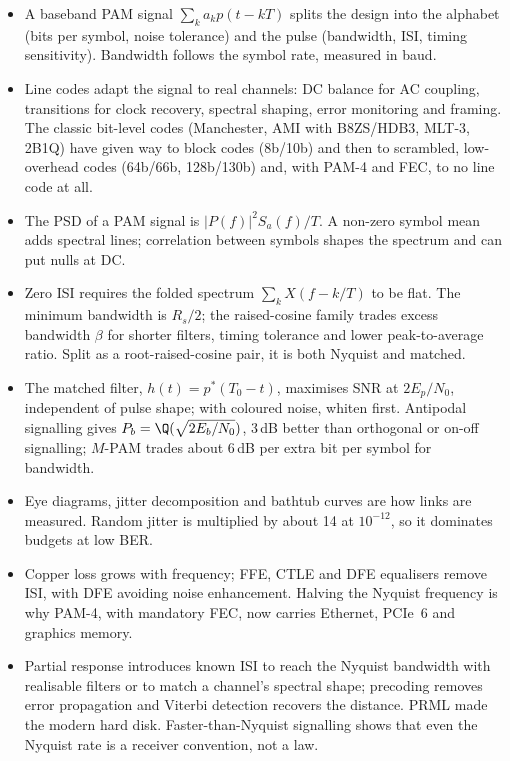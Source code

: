 \begin{itemize}
\item A baseband PAM signal $\sum_ka_kp(t-kT)$ splits the design into the alphabet (bits per
symbol, noise tolerance) and the pulse (bandwidth, ISI, timing sensitivity). Bandwidth follows
the symbol rate, measured in baud.
\item Line codes adapt the signal to real channels: DC balance for AC coupling, transitions for
clock recovery, spectral shaping, error monitoring and framing. The classic bit-level codes
(Manchester, AMI with B8ZS/HDB3, MLT-3, 2B1Q) have given way to block codes (8b/10b) and then to
scrambled, low-overhead codes (64b/66b, 128b/130b) and, with PAM-4 and FEC, to no line code at
all.
\item The PSD of a PAM signal is $|P(f)|^2S_a(f)/T$. A non-zero symbol mean adds spectral lines;
correlation between symbols shapes the spectrum and can put nulls at DC.
\item Zero ISI requires the folded spectrum $\sum_kX(f-k/T)$ to be flat. The minimum bandwidth is
$R_s/2$; the raised-cosine family trades excess bandwidth $\beta$ for shorter filters, timing
tolerance and lower peak-to-average ratio. Split as a root-raised-cosine pair, it is both
Nyquist and matched.
\item The matched filter, $h(t)=p^*(T_0-t)$, maximises SNR at $2E_p/N_0$, independent of pulse
shape; with coloured noise, whiten first. Antipodal signalling gives $P_b=\Q(\sqrt{2E_b/N_0})$,
3\,dB better than orthogonal or on-off signalling; $M$-PAM trades about 6\,dB per extra bit per
symbol for bandwidth.
\item Eye diagrams, jitter decomposition and bathtub curves are how links are measured. Random
jitter is multiplied by about 14 at $10^{-12}$, so it dominates budgets at low BER.
\item Copper loss grows with frequency; FFE, CTLE and DFE equalisers remove ISI, with DFE avoiding
noise enhancement. Halving the Nyquist frequency is why PAM-4, with mandatory FEC, now carries
Ethernet, PCIe~6 and graphics memory.
\item Partial response introduces known ISI to reach the Nyquist bandwidth with realisable filters
or to match a channel's spectral shape; precoding removes error propagation and Viterbi detection
recovers the distance. PRML made the modern hard disk. Faster-than-Nyquist signalling shows that
even the Nyquist rate is a receiver convention, not a law.
\end{itemize}

